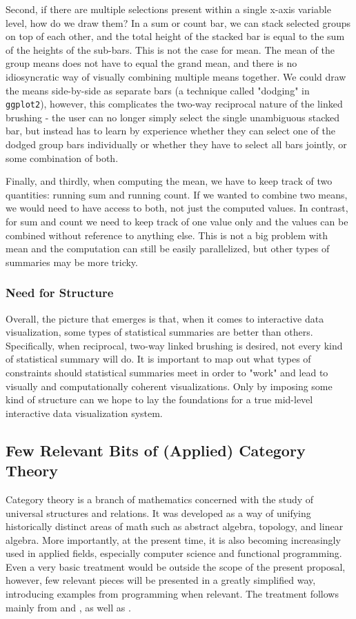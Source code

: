 \documentclass[12pt,a4paper]{article}
\begin{document}
Second, if there are multiple selections present within a single x-axis variable level, how do we draw them? In a sum or count bar, we can stack selected groups on top of each other, and the total height of the stacked bar is equal to the sum of the heights of the sub-bars. This is not the case for mean. The mean of the group means does not have to equal the grand mean, and there is no idiosyncratic way of visually combining multiple means together. We could draw the means side-by-side as separate bars (a technique called "dodging" in \texttt{ggplot2}), however, this complicates the two-way reciprocal nature of the linked brushing - the user can no longer simply select the single unambiguous stacked bar, but instead has to learn by experience whether they can select one of the dodged group bars individually or whether they have to select all bars jointly, or some combination of both. 

Finally, and thirdly, when computing the mean, we have to keep track of two quantities: running sum and running count. If we wanted to combine two means, we would need to have access to both, not just the computed values. In contrast, for sum and count we need to keep track of one value only and the values can be combined without reference to anything else. This is not a big problem with mean and the computation can still be easily parallelized, but other types of summaries may be more tricky.

\subsubsection{Need for Structure}

Overall, the picture that emerges is that, when it comes to interactive data visualization, some types of statistical summaries are better than others. Specifically, when reciprocal, two-way linked brushing is desired, not every kind of statistical summary will do. It is important to map out what types of constraints should statistical summaries meet in order to "work" and lead to visually and computationally coherent visualizations. Only by imposing some kind of structure can we hope to lay the foundations for a true mid-level interactive data visualization system. 


\subsection{Few Relevant Bits of (Applied) Category Theory}

Category theory is a branch of mathematics concerned with the study of universal structures and relations. It was developed as a way of unifying historically distinct areas of math such as abstract algebra, topology, and linear algebra. More importantly, at the present time, it is also becoming increasingly used in applied fields, especially computer science and functional programming. Even a very basic treatment would be outside the scope of the present proposal, however, few relevant pieces will be presented in a greatly simplified way, introducing examples from programming when relevant. The treatment follows mainly from \cite{fong2019} and \cite{Milewski2018}, as well as \cite{leinster2014}.
\end{document}
